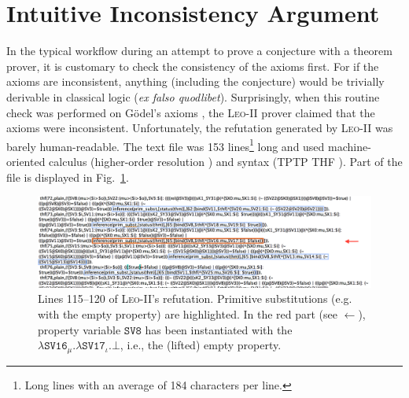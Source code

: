 \documentclass{llncs}
\begin{document}


\section{Intuitive Inconsistency Argument} \label{sec:inconsistency}

In the typical workflow during an attempt to prove a conjecture with a theorem prover, it is customary to check the consistency of the axioms first. For if the axioms are inconsistent, anything (including the conjecture) would be trivially derivable in classical logic (\emph{ex falso quodlibet}). Surprisingly, when this routine check was performed on G\"odel's axioms \cite{C40}, the \textsc{Leo-II} prover claimed that the axioms were inconsistent. Unfortunately, the refutation generated by \textsc{Leo-II} was barely human-readable. The text file was 153 lines\footnote{Long lines with an average of 184 characters per line.} long and used machine-oriented calculus (higher-order resolution \cite{W47}) and syntax (TPTP THF \cite{J22}). Part of the file is displayed in Fig.~\ref{LEO-Proof}.

\begin{figure}
\centerline{\includegraphics[width=\textwidth]{./LEO-Proof.png}}
\caption{Lines 115--120 of \textsc{Leo-II}'s refutation. Primitive
  substitutions (e.g. with the empty property) are highlighted. In the
red part (see $\boldsymbol{\leftarrow}$), property variable $\texttt{SV8}$ has been instantiated with the
$\lambda \texttt{SV16}_{\mu}. \lambda \texttt{SV17}_{\iota}. \bot$, i.e., the (lifted) empty property.
} \label{LEO-Proof}
\end{figure}
\end{document}
